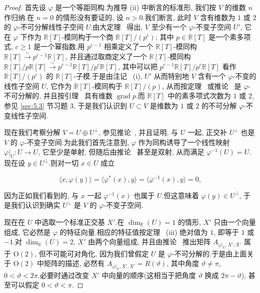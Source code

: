 \begin{proof}
首先设 $\varphi$ 是一个等距同构.为推导 (ii) 中断言的标准形, 我们按 $V$ 的维数 $n$ 作归纳.在 $n = 0$ 的情形没有要证的, 设 $n > 0$.我们断言, 此时 $V$ 含有维数为 $1$ 或 $2$ 的 $\varphi$-不可分解线性子空间 $U$.由大定理~ 得出, $V$ 至少有一个 $\varphi$-不变子空间 $U'$, 它在 $\varphi$ 下作为 $\mathbb{R}[T]$-模同构于一个商 $\mathbb{R}[T]/(p^c)$; 其中 $p \in \mathbb{R}[T]$ 是一个素多项式, $c \geq 1$ 是一个幂指数.用 $p^{c-1}$ 相乘定义了一个 $\mathbb{R}[T]$-模同构 $\mathbb{R}[T] \xrightarrow{\sim} p^{c-1}\mathbb{R}[T]$, 并且通过取商定义了一个 $\mathbb{R}[T]$-模同构 $\mathbb{R}[T]/p\mathbb{R}[T] \xrightarrow{\sim} p^{c-1}\mathbb{R}[T]/p^c\mathbb{R}[T]$, 其中可以把 $p^{c-1}\mathbb{R}[T]/p^c\mathbb{R}[T]$ 看作 $\mathbb{R}[T]/(p^c)$ 的 $\mathbb{R}[T]$-子模.于是由注记~ (i), $U'$ 从而特别地 $V$ 含有一个 $\varphi$-不变的线性子空间 $U$, 它作为 $\mathbb{R}[T]$-模同构于 $\mathbb{R}[T]/(p)$, 从而按定理~ 或推论~ 是 $\varphi$-不可分解的, 并且按引理~ 具有维数 $\operatorname{grad} p$.而 $\mathbb{R}[T]$ 中的素多项式次数为 $1$ 或 $2$, 参见 \ref{sec:5.3} 节习题 3, 于是我们认识到 $U \subset V$ 是维数为 $1$ 或 $2$ 的不可分解 $\varphi$-不变线性子空间.

现在我们考察分解 $V = U \oplus U^{\perp}$, 参见推论~, 并且证明, 与 $U$ 一起, 正交补 $U^{\perp}$ 也是 $V$ 的 $\varphi$-不变子空间.为此我们首先注意到, $\varphi$ 作为同构诱导了一个线性映射 $\varphi|_{U} \colon U \longrightarrow U$, 它至少是单射, 但随后由推论~ 甚至是双射, 从而满足 $\varphi^{-1}(U) = U$.现在设 $y \in U^{\perp}$.则对一切 $x \in U$ 成立

\[
\bigl\langle x, \varphi(y) \bigr\rangle = \bigl\langle \varphi^*(x), y \bigr\rangle = \bigl\langle \varphi^{-1}(x), y \bigr\rangle = 0,
\]

因为正如我们看到的, 与 $x$ 一起 $\varphi^{-1}(x)$ 也属于 $U$.但这意味着 $\varphi(y) \in U^{\perp}$, 于是我们认识到确实 $U^{\perp}$ 是 $V$ 的 $\varphi$-不变子空间.

现在在 $U$ 中选取一个标准正交基 $X'$.在 $\dim_{\mathbb{R}}(U) = 1$ 的情形, $X'$ 只由一个向量组成, 它必然是 $\varphi$ 的特征向量.相应的特征值按定理~ (iii) 绝对值为 $1$, 即等于 $1$ 或 $-1$.对 $\dim_{\mathbb{R}}(U) = 2$, $X'$ 由两个向量组成, 并且由推论~ 推出矩阵 $A_{\varphi|_{U}, X', X'}$ 属于 $\mathrm{O}(2)$, 但不可能可对角化, 因为我们曾假定 $U$ 是 $\varphi$-不可分解的.于是由上面关于 $\mathrm{O}(2)$ 中矩阵的描述, 必然有 $A_{\varphi|_{U}, X', X'} = R(\vartheta)$, 其中角度 $\vartheta \neq \pi$, $0 < \vartheta < 2\pi$.必要时通过改变 $X'$ 中向量的顺序(这相当于把角度 $\vartheta$ 换成 $2\pi - \vartheta$), 甚至可以假定 $0 < \vartheta < \pi$.


\end{proof}
